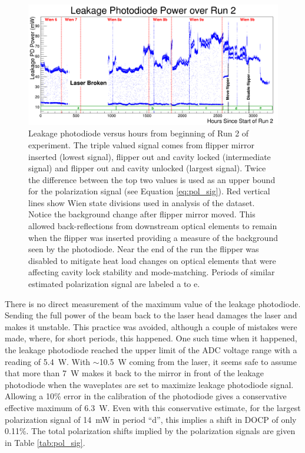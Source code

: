 \begin{landscape}
\begin{figure}
\centering
\includegraphics[width=9in]{./Pictures/LeakagePDvsTime_Run2.png}
\caption{\label{fig:rrpd_vs_time}Leakage photodiode versus hours from beginning of Run 2 of \Qs experiment. The triple valued signal comes from flipper mirror inserted (lowest signal), flipper out and cavity locked (intermediate signal) and flipper out and cavity unlocked (largest signal). Twice the difference between the top two values is used as an upper bound for the polarization signal (see Equation \ref{eq:pol_sig}).  Red vertical lines show Wien state divisions used in analysis of the \Qs dataset. Notice the background change after flipper mirror moved. This allowed back-reflections from downstream optical elements to remain when the flipper was inserted providing a measure of the background seen by the photodiode. Near the end of the run the flipper was disabled to mitigate heat load changes on optical elements that were affecting cavity lock stability and mode-matching. Periods of similar estimated polarization signal are labeled a to e.}
\end{figure}
\end{landscape}

There is no direct measurement of the maximum value of the leakage photodiode. Sending the full power of the beam back to the laser head damages the laser and makes it unstable. This practice was avoided, although a couple of mistakes were made, where, for short periods, this happened. One such time when it happened, the leakage photodiode reached the upper limit of the ADC voltage range with a reading of 5.4~W. With $\sim$10.5~W coming from the laser, it seems safe to assume that more than 7~W makes it back to the mirror in front of the leakage photodiode when the waveplates are set to maximize leakage photodiode signal. Allowing a 10\% error in the calibration of the photodiode gives a conservative effective maximum of 6.3~W. Even with this conservative estimate, for the largest polarization signal of 14~mW in period ``d'', this implies a shift in DOCP of only 0.11\%. The total polarization shifts implied by the polarization signals are given in Table \ref{tab:pol_sig}.


